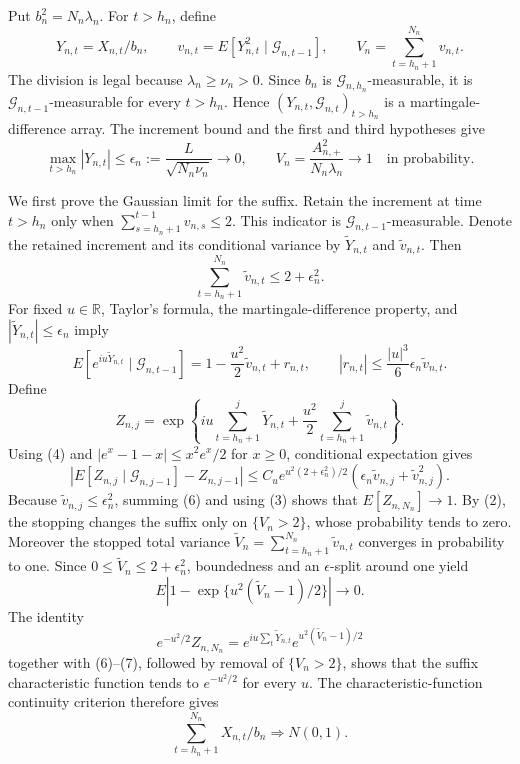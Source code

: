 Put \(b_n^2=N_n\lambda_n\).  For \(t>h_n\), define
\[
 Y_{n,t}=X_{n,t}/b_n,\qquad
 v_{n,t}=E[Y_{n,t}^2\mid\mathcal G_{n,t-1}],\qquad
 V_n=\sum_{t=h_n+1}^{N_n}v_{n,t}.
\tag{1}
\]
The division is legal because \(\lambda_n\ge\nu_n>0\).  Since \(b_n\) is
\(\mathcal G_{n,h_n}\)-measurable, it is \(\mathcal G_{n,t-1}\)-measurable for
every \(t>h_n\).  Hence \((Y_{n,t},\mathcal G_{n,t})_{t>h_n}\) is a
martingale-difference array.  The increment bound and the first and third
hypotheses give
\[
 \max_{t>h_n}|Y_{n,t}|\le
 \epsilon_n:=\frac{L}{\sqrt{N_n\nu_n}}\longrightarrow0,
 \qquad
 V_n=\frac{A_{n,+}^2}{N_n\lambda_n}\longrightarrow1
 \quad\text{in probability}.
\tag{2}
\]

We first prove the Gaussian limit for the suffix.  Retain the increment at
time \(t>h_n\) only when
\(\sum_{s=h_n+1}^{t-1}v_{n,s}\le2\).  This indicator is
\(\mathcal G_{n,t-1}\)-measurable.  Denote the retained increment and its
conditional variance by \(\widetilde Y_{n,t}\) and \(\widetilde v_{n,t}\).
Then
\[
 \sum_{t=h_n+1}^{N_n}\widetilde v_{n,t}\le2+\epsilon_n^2.
\tag{3}
\]
For fixed \(u\in\mathbb R\), Taylor's formula, the martingale-difference
property, and \(|\widetilde Y_{n,t}|\le\epsilon_n\) imply
\[
 E[e^{iu\widetilde Y_{n,t}}\mid\mathcal G_{n,t-1}]
 =1-\frac{u^2}{2}\widetilde v_{n,t}+r_{n,t},
 \qquad
 |r_{n,t}|\le\frac{|u|^3}{6}\epsilon_n\widetilde v_{n,t}.
\tag{4}
\]
Define
\[
 Z_{n,j}=\exp\!\left\{iu\sum_{t=h_n+1}^j\widetilde Y_{n,t}
 +\frac{u^2}{2}\sum_{t=h_n+1}^j\widetilde v_{n,t}\right\}.
\tag{5}
\]
Using (4) and
\(|e^x-1-x|\le x^2e^x/2\) for \(x\ge0\), conditional expectation gives
\[
 \left|E[Z_{n,j}\mid\mathcal G_{n,j-1}]-Z_{n,j-1}\right|
 \le C_u e^{u^2(2+\epsilon_n^2)/2}
 \left(\epsilon_n\widetilde v_{n,j}+\widetilde v_{n,j}^2\right).
\tag{6}
\]
Because \(\widetilde v_{n,j}\le\epsilon_n^2\), summing (6) and using (3)
shows that \(E[Z_{n,N_n}]\to1\).  By (2), the stopping changes the suffix
only on \(\{V_n>2\}\), whose probability tends to zero.  Moreover the stopped
total variance
\(\widetilde V_n=\sum_{t=h_n+1}^{N_n}\widetilde v_{n,t}\) converges in
probability to one.  Since \(0\le\widetilde V_n\le2+\epsilon_n^2\), boundedness
and an \(\epsilon\)-split around one yield
\[
 E\left|1-\exp\{u^2(\widetilde V_n-1)/2\}\right|\longrightarrow0.
\tag{7}
\]
The identity
\[
 e^{-u^2/2}Z_{n,N_n}
 =e^{iu\sum_t\widetilde Y_{n,t}}
 e^{u^2(\widetilde V_n-1)/2}
\]
together with (6)--(7), followed by removal of \(\{V_n>2\}\), shows that
the suffix characteristic function tends to \(e^{-u^2/2}\) for every
\(u\).  The characteristic-function continuity criterion therefore gives
\[
 \sum_{t=h_n+1}^{N_n}X_{n,t}/b_n\Rightarrow N(0,1).
\tag{8}
\]

